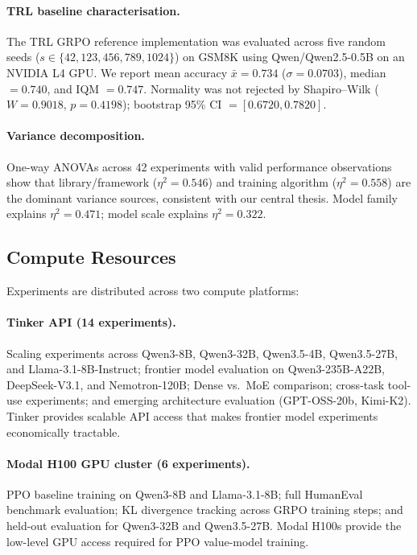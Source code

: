 \documentclass{article}
\begin{document}
\paragraph{TRL baseline characterisation.}
The TRL GRPO reference implementation was evaluated across five random seeds
($s \in \{42, 123, 456, 789, 1024\}$) on GSM8K using Qwen/Qwen2.5-0.5B on
an NVIDIA L4 GPU. We report mean accuracy $\bar{x} = 0.734$ ($\sigma = 0.0703$),
median $= 0.740$, and IQM $= 0.747$. Normality was not rejected by Shapiro--Wilk
($W = 0.9018$, $p = 0.4198$); bootstrap 95\% CI $= [0.6720, 0.7820]$.

\paragraph{Variance decomposition.}
One-way ANOVAs across 42 experiments with valid performance observations show
that library/framework ($\eta^2 = 0.546$) and training algorithm ($\eta^2 = 0.558$)
are the dominant variance sources, consistent with our central thesis. Model
family explains $\eta^2 = 0.471$; model scale explains $\eta^2 = 0.322$.

\subsection{Compute Resources}

Experiments are distributed across two compute platforms:

\paragraph{Tinker API (14 experiments).}
Scaling experiments across Qwen3-8B, Qwen3-32B, Qwen3.5-4B, Qwen3.5-27B,
and Llama-3.1-8B-Instruct; frontier model evaluation on Qwen3-235B-A22B,
DeepSeek-V3.1, and Nemotron-120B; Dense vs.~MoE comparison; cross-task
tool-use experiments; and emerging architecture evaluation (GPT-OSS-20b,
Kimi-K2). Tinker provides scalable API access that makes frontier model
experiments economically tractable.

\paragraph{Modal H100 GPU cluster (6 experiments).}
PPO baseline training on Qwen3-8B and Llama-3.1-8B; full HumanEval
benchmark evaluation; KL divergence tracking across GRPO training steps;
and held-out evaluation for Qwen3-32B and Qwen3.5-27B. Modal H100s
provide the low-level GPU access required for PPO value-model training.
\end{document}
